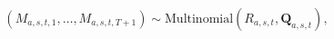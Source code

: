 \begin{equation}
  (M_{a, s, t, 1}, \ldots, M_{a, s, t, T + 1})
  \sim
  \text{Multinomial}(R_{a, s, t}, \boldsymbol{Q}_{a, s, t}),
  \label{eqn:capture-recapture-submodel}
\end{equation}